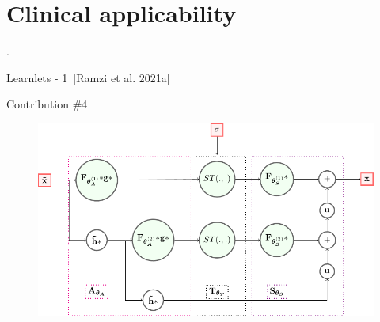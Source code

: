 \section{Clinical applicability}

\begin{frame}[plain,c]

    \begin{center}
        \color{DarkBlue}
    \Huge \thesection. \insertsection
    \end{center}

\end{frame}


\begin{frame}{Learnlets - 1~[Ramzi et al. 2021a]}
    \begin{exampleblock}{Contribution \#4}
    \end{exampleblock}
    \begin{figure}
        \centering
        \includegraphics[height=0.53\textheight]{Figures/clinic_applic/learnlets_tikz_reduced.pdf}
    \end{figure}
    \let\thefootnote\relax{}
\end{frame}

